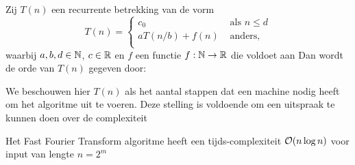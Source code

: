 \begin{stelling}
    Zij $T(n)$ een recurrente betrekking van de vorm
    \[
    T(n) = \begin{cases}
      c_0 &\text{ als } n \leq d \\
      a T(n/b) + f(n) &\text{ anders}, \\
    \end{cases}
    \]
    waarbij $a,b,d\in\mathbb{N}$, $c\in\mathbb{R}$ en $f$ een functie $f:\mathbb{N}\rightarrow\mathbb{R}$ die voldoet aan 
    Dan wordt de orde van $T(n)$ gegeven door:
\end{stelling}
We beschouwen hier $T(n)$ als het aantal stappen dat een machine nodig heeft om het algoritme uit te voeren.
Deze stelling is voldoende om een uitspraak te kunnen doen over de complexiteit 
\begin{stelling}
  Het Fast Fourier Transform algoritme heeft een tijds-complexiteit $\mathcal{O}(n\log n)$ voor input van lengte $n=2^m$ 
\end{stelling} 
